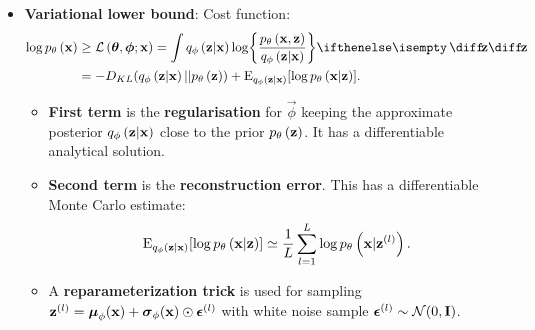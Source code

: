 \begin{itemize}
	\item \textbf{Variational lower bound}: Cost function: 
		\begin{gather*}
			\begin{split}
				\log \dec{\vec{x}} & \ge \mathcal{L}\left(\vec{\theta},\vec{\phi};\vec{x}\right) =
				\int \enc{\vec{z}|\vec{x}} \log \curlies*{ \frac{\dec{\vec{x},\vec{z}}}{\enc{\vec{z}|\vec{x}} } } \D{\vec{z}} \\
				& = -D_{KL}\parens{ \enc{\vec{z}|\vec{x}}||\dec{\vec{z}} } + \E_{\enc{\vec{z}|\vec{x}}} \brackets*{\log \dec{\vec{x}|\vec{z}}} .
			\end{split}
		\end{gather*}
	\begin{itemize}
		\item \textbf{First term} is the \textbf{regularisation} for $\vec{\phi}$ keeping the approximate posterior $q_{\phi}\left(\bm{\mathrm{z}}|\bm{\mathrm{x}}\right)$ close to the prior $p_{\theta}\left(\bm{\mathrm{z}}\right)$. It has a differentiable analytical solution.
		\item \textbf{Second term} is the \textbf{reconstruction error}. This has a differentiable Monte Carlo estimate:
		\begin{equation*}
			\operatorname{E}_{q_{\phi}\left(\bm{\mathrm{z}}|\bm{\mathrm{x}}\right)} [\log p_{\theta}\left(\bm{\mathrm{x}}|\bm{\mathrm{z}}\right) ] \simeq \frac{1}{L}\sum^L_{l=1} \log p_{\theta}\left(\bm{\mathrm{x}}|\bm{\mathrm{z}}^{(l)}\right).
		\end{equation*}
		\item A \textbf{reparameterization trick} is used for sampling $\bm{\mathrm{z}}^{(l)}= \bm{\mathrm{\mu}}_\phi(\bm{\mathrm{x}}) + \bm{\mathrm{\sigma}}_\phi(\bm{\mathrm{x}}) \odot \bm{\mathrm{\epsilon}}^{(l)}$ with white noise sample $\bm{\mathrm{\epsilon}}^{(l)} \sim \mathcal{N}(0,\bm{\mathrm{I}})$.
		\end{itemize}
	
\end{itemize}



